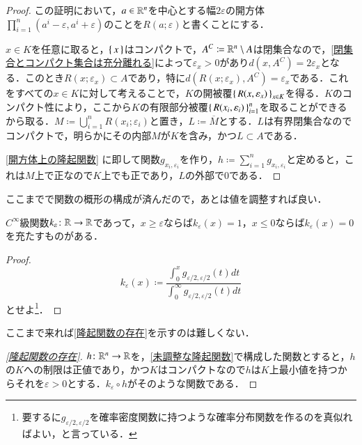 \begin{proof}
この証明において，$a \in \mathbb{R}^n$を中心とする幅$2\varepsilon$の開方体$\prod_{i=1}^n (a^i - \varepsilon, a^i + \varepsilon)$のことを$R(a; \varepsilon)$と書くことにする．

$x \in K$を任意に取ると，$\set{x}$はコンパクトで，$A^C \coloneqq \mathbb{R}^n \setminus A$は閉集合なので，\cref{閉集合とコンパクト集合は充分離れる}によって$\varepsilon_x > 0$があり$d\left(x,A^C\right) = 2\varepsilon_x$となる．このとき$R(x;\varepsilon_x) \subset A$であり，特に$d\left(R(x;\varepsilon_x), A^C\right) = \varepsilon_x$である．これをすべての$x \in K$に対して考えることで，$K$の開被覆$\set{ R(x,\varepsilon_x) }_{x \in K}$を得る．$K$のコンパクト性により，ここから$K$の有限部分被覆$\set{ R(x_i, \varepsilon_i) }_{i=1}^n$を取ることができるから取る．$M \coloneqq \bigcup_{i=1}^n R(x_i; \varepsilon_i)$と置き，$L \coloneqq \overline{M}$とする．$L$は有界閉集合なのでコンパクトで，明らかにその内部$M$が$K$を含み，かつ$L \subset A$である．

\cref{開方体上の隆起関数} に即して関数$g_{x_i,\varepsilon_i}$を作り，$h \coloneqq \sum_{i=1}^n g_{x_i, \varepsilon_i}$と定めると，これは$M$上で正なので$K$上でも正であり，$L$の外部で0である．
\end{proof}

ここまでで関数の概形の構成が済んだので，あとは値を調整すれば良い．

\begin{lem}
$C^\infty$級関数$k_\varepsilon \colon \mathbb{R} \to \mathbb{R}$であって，$x\geq \varepsilon$ならば$k_\varepsilon(x) =1$，$x \leq 0$ならば$k_\varepsilon(x)=0$を充たすものがある．
\end{lem}

\begin{proof}
\begin{equation}
k_\varepsilon(x) \coloneqq \frac{\int_0^x g_{\varepsilon/2, \varepsilon/2} (t) dt}{\int_0^\infty g_{\varepsilon/2, \varepsilon/2}(t) dt}
\end{equation}とせよ\footnote{要するに$g_{\varepsilon/2, \varepsilon/2}$を確率密度関数に持つような確率分布関数を作るのを真似ればよい，と言っている．}．
\end{proof}

ここまで来れば\cref{隆起関数の存在}を示すのは難しくない．

\begin{proof}[\cref{隆起関数の存在}]
$h \colon \mathbb{R}^n \to \mathbb{R}$を，\cref{未調整な隆起関数}で構成した関数とすると，$h$の$K$への制限は正値であり，かつ$K$はコンパクトなので$h$は$K$上最小値を持つからそれを$\varepsilon > 0$とする．$k_\varepsilon \circ h$がそのような関数である．
\end{proof}

